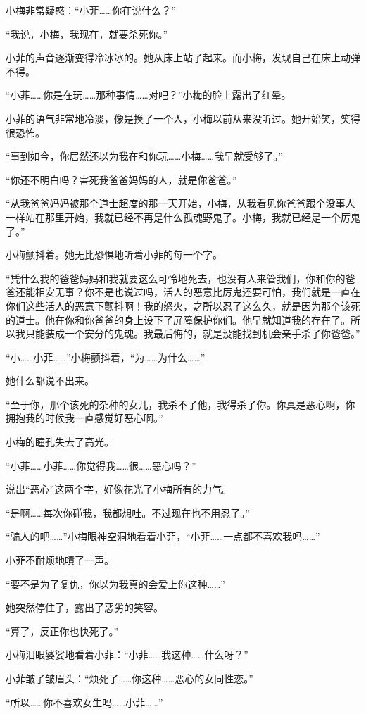 \documentclass[12pt,a4paper]{ctexart}
\begin{document}
小梅非常疑惑：“小菲……你在说什么？”

“我说，小梅，我现在，就要杀死你。”

小菲的声音逐渐变得冷冰冰的。她从床上站了起来。而小梅，发现自己在床上动弹不得。

“小菲……你是在玩……那种事情……对吧？”小梅的脸上露出了红晕。

小菲的语气非常地冷淡，像是换了一个人，小梅以前从来没听过。她开始笑，笑得很恐怖。

“事到如今，你居然还以为我在和你玩……小梅……我早就受够了。”

“你还不明白吗？害死我爸爸妈妈的人，就是你爸爸。”

“从我爸爸妈妈被那个道士超度的那一天开始，小梅，从我看见你爸爸跟个没事人一样站在那里开始，我就已经不再是什么孤魂野鬼了。小梅，我就已经是一个厉鬼了。”

小梅颤抖着。她无比恐惧地听着小菲的每一个字。

“凭什么我的爸爸妈妈和我就要这么可怜地死去，也没有人来管我们，你和你的爸爸还能相安无事？你不是也说过吗，活人的恶意比厉鬼还要可怕，我们就是一直在你们这些活人的恶意下颤抖啊！我的怒火，之所以忍了这么久，就是因为那个该死的道士。他在你和你爸爸的身上设下了屏障保护你们。他早就知道我的存在了。所以我只能装成一个安分的鬼魂。我最后悔的，就是没能找到机会亲手杀了你爸爸。”

“小……小菲……”小梅颤抖着，“为……为什么……”

她什么都说不出来。

“至于你，那个该死的杂种的女儿，我杀不了他，我得杀了你。你真是恶心啊，你拥抱我的时候我一直感觉好恶心啊。”

小梅的瞳孔失去了高光。

“小菲……小菲……你觉得我……很……恶心吗？”

说出“恶心”这两个字，好像花光了小梅所有的力气。

“是啊……每次你碰我，我都想吐。不过现在也不用忍了。”

“骗人的吧……”小梅眼神空洞地看着小菲，“小菲……一点都不喜欢我吗……”

小菲不耐烦地嘖了一声。

“要不是为了复仇，你以为我真的会爱上你这种……”

她突然停住了，露出了恶劣的笑容。

“算了，反正你也快死了。”

小梅泪眼婆娑地看着小菲：“小菲……我这种……什么呀？”

小菲皱了皱眉头：“烦死了……你这种……恶心的女同性恋。”

“所以……你不喜欢女生吗……小菲……”
\end{document}
